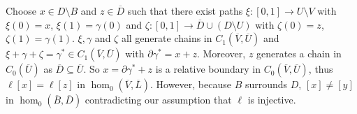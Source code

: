   Choose $x\in D\setminus B$ and $z\in \overline{D}$ such that there exist paths $\xi : [0,1]\to U\setminus V$ with $\xi(0) = x$, $\xi(1) = \gamma(0)$ and $\zeta : [0,1]\to \overline{D}\cup (D\setminus U)$ with $\zeta(0) = z$, $\zeta(1) = \gamma(1)$.
  $\xi, \gamma$ and $\zeta$ all generate chains in $C_1(\overline{V}, \overline{U})$ and $\xi + \gamma + \zeta = \gamma^*\in C_1(\overline{V}, \overline{U})$ with $\partial\gamma^* = x + z$.
  Moreover, $z$ generates a chain in $C_0(\overline{U})$ as $\overline{D}\subseteq\overline{U}$.
  So $x = \partial\gamma^* + z$ is a relative boundary in $C_0(\overline{V}, \overline{U})$, thus $\ell[x] = \ell[z]$ in $\hom_0(\overline{V}, \overline{L})$.
  However, because $B$ surrounds $D$, $[x]\neq [y]$ in $\hom_0(\overline{B}, \overline{D})$ contradicting our assumption that $\ell$ is injective.
\endproofatend

